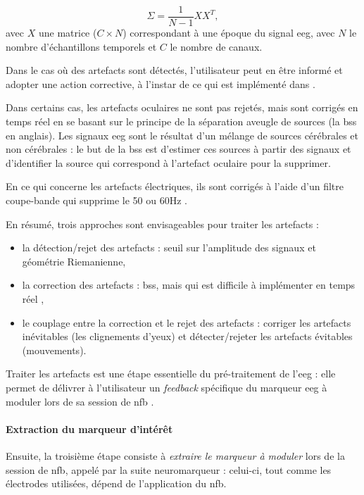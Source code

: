 \begin{equation}
\label{eq:introduction_covariance_matrix}
\Sigma = \frac{1}{N - 1}XX^T,
\end{equation}
avec $X$ une matrice ($C \times N$) correspondant à une époque du signal \gls{eeg}, avec $N$ le nombre d'échantillons temporels et $C$ le nombre de canaux. 

Dans le cas où des artefacts sont détectés, l'utilisateur peut en être informé et adopter une action corrective, à l'instar de ce qui est implémenté dans 
\citet{Bioulac2019}.

Dans certains cas, les artefacts oculaires ne sont pas rejetés, mais sont corrigés en temps réel \citep{Barthelemy2017, Maurizio2014, Bioulac2019} en se basant sur
le principe de la séparation aveugle de sources (la \gls{bss} en anglais). Les signaux \gls{eeg} sont le résultat d'un mélange de sources cérébrales et non cérébrales : le but 
de la \gls{bss} est d'estimer ces sources à partir des signaux et d'identifier la source qui correspond à l'artefact oculaire pour la supprimer.

En ce qui concerne les artefacts électriques, ils sont corrigés à l'aide d'un filtre coupe-bande qui supprime le 50 ou 60Hz \citep{Bioulac2019}.

En résumé, trois approches sont envisageables pour traiter les artefacts :
\begin{itemize}
\item la détection/rejet des artefacts : seuil sur l'amplitude des signaux et géométrie Riemanienne,
\item la correction des artefacts : \gls{bss}, mais qui est difficile à implémenter en temps réel \citep{Barthelemy2017},
\item le couplage entre la correction et le rejet des artefacts : corriger les artefacts inévitables (les clignements d'yeux) 
et détecter/rejeter les artefacts évitables (mouvements).
\end{itemize}

Traiter les artefacts est une étape essentielle du pré-traitement de l'\gls{eeg} : elle permet de délivrer à l'utilisateur un \textit{feedback} 
spécifique du marqueur \gls{eeg} à moduler lors de sa session de \gls{nfb} \citep{Barthelemy2019}. 

\paragraph{Extraction du marqueur d'intérêt}
Ensuite, la troisième étape consiste à \emph{extraire le marqueur à moduler} lors de la session de \gls{nfb}, appelé par la suite neuromarqueur : 
celui-ci, tout comme les électrodes utilisées, dépend de l'application du \gls{nfb}. 

